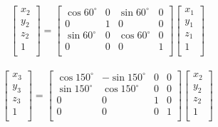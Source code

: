 \documentclass[a4paper,10pt]{jsarticle}
\begin{document}
\begin{eqnarray}
\label{eq:b}
  \left[
    \begin{array}{c}
      x_2\\
      y_2\\
      z_2\\
      1\\
    \end{array}
  \right] =
  \left[
    \begin{array}{cccc}
      \cos{60^\circ} & 0 & \sin{60^\circ} & 0 \\
      0 & 1 & 0 & 0\\
      \sin{60^\circ} & 0 & \cos{60^\circ} & 0\\
      0 & 0 & 0 & 1\\
    \end{array}
  \right]\left[
    \begin{array}{c}
      x_1\\
      y_1\\
      z_1\\
      1\\
    \end{array}
  \right]
\end{eqnarray}

\begin{eqnarray}
\label{eq:c}
  \left[
    \begin{array}{c}
      x_3\\
      y_3\\
      z_3\\
      1\\
    \end{array}
  \right] =
  \left[
    \begin{array}{cccc}
      \cos{150^\circ} & -\sin{150^\circ} & 0 & 0 \\
      \sin{150^\circ} & \cos{150^\circ} & 0 & 0\\
      0 & 0 & 1 & 0\\
      0 & 0 & 0 & 1\\
    \end{array}
  \right]\left[
    \begin{array}{c}
      x_2\\
      y_2\\
      z_2\\
      1\\
    \end{array}
  \right]
\end{eqnarray}
\end{document}
